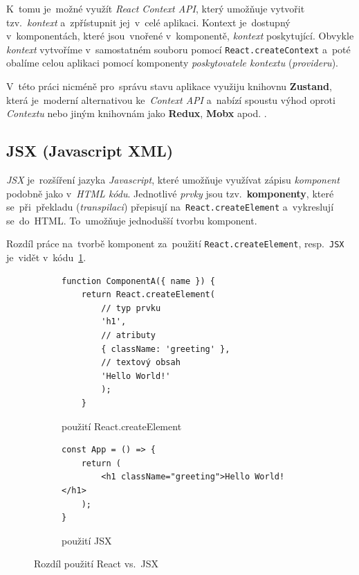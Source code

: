 \documentclass[10pt,a4paper]{article}
\begin{document}
            K~tomu je~možné využít \emph{React Context API}, který umožňuje vytvořit tzv.~\emph{kontext} a~zpřístupnit jej~v~celé aplikaci. Kontext je~dostupný v~komponentách, které jsou~vnořené v~komponentě, \emph{kontext} poskytující. Obvykle \emph{kontext} vytvoříme v~samostatném souboru pomocí \texttt{React.createContext} a~poté obalíme celou aplikaci pomocí komponenty \emph{poskytovatele kontextu} (\emph{provideru}).
            
            V~této práci nicméně pro~správu stavu aplikace využiju knihovnu \textbf{Zustand}, která je~moderní alternativou ke~\emph{Context API} a~nabízí spoustu výhod oproti \emph{Contextu} nebo jiným knihovnám jako \textbf{Redux}, \textbf{Mobx} apod. \cite{openreplayReactState}.

        \subsection{JSX (Javascript XML)}
            \emph{JSX} je~rozšíření jazyka \emph{Javascript}, které umožňuje využívat zápisu \emph{komponent} podobně jako v~\emph{HTML kódu}. Jednotlivé \emph{prvky} jsou tzv.~\textbf{komponenty}, které se~při~překladu (\emph{transpilaci}) přepisují na~\texttt{React.createElement} a~vykreslují se~do~HTML. To~umožňuje jednodušší tvorbu komponent. \cite{reactJSX}
            
            Rozdíl práce na~tvorbě komponent za~použití \texttt{React.createElement}, resp.~\texttt{JSX} je~vidět v~kódu~\ref{JSXcomponent}.
            \begin{figure}
                \begin{subfigure}[b]{0.45\linewidth}
                    \begin{verbatim}
function ComponentA({ name }) {
    return React.createElement(
        // typ prvku
        'h1',
        // atributy
        { className: 'greeting' },
        // textový obsah
        'Hello World!'
        );
    }
                    \end{verbatim}
                \caption{použití React.createElement}
                \end{subfigure}
                \hfill
                \begin{subfigure}[b]{0.45\linewidth}
                    \begin{verbatim}
const App = () => {
    return (
        <h1 className="greeting">Hello World!</h1>
    );
}
                    \end{verbatim}
                    \vspace{1cm}
                    \caption{použití JSX}
                \end{subfigure}
                \caption{Rozdíl použití React vs.~JSX}
                \label{JSXcomponent}
            \end{figure}
\end{document}
